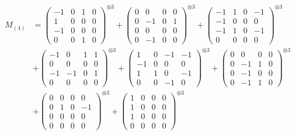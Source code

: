 \documentclass{article}
\newcommand{\Mthree}{%
    M_{(4)}
}
\begin{document}
        \footnotesize{
        \begin{align}
        \Mthree
        &= \label{Rs13-Rc12-Solution-1-c1} \begin{pmatrix} -1 & 0 & 1 & 0 \\ 1 & 0 & 0 & 0 \\ -1 & 0 & 0 & 0 \\ 0 & 0 & 1 & 0 \end{pmatrix}^{\otimes 3} 
            + \begin{pmatrix} 0 & 0 & 0 & 0 \\ 0 & -1 & 0 & 1 \\ 0 & 0 & 0 & 0 \\ 0 & -1 & 0 & 0 \end{pmatrix}^{\otimes 3} 
            + \begin{pmatrix} -1 & 1 & 0 & -1 \\ -1 & 0 & 0 & 0 \\ -1 & 1 & 0 & -1 \\ 0 & 0 & 0 & 0 \end{pmatrix}^{\otimes 3} \\
        &+ \label{Rs13-Rc12-Solution-1-c4} \begin{pmatrix} -1 & 0 & 1 & 1 \\ 0 & 0 & 0 & 0 \\ -1 & -1 & 0 & 1 \\ 0 & 0 & 0 & 0 \end{pmatrix}^{\otimes 3} 
            + \begin{pmatrix} 1 & 0 & -1 & -1 \\ -1 & 0 & 0 & 0 \\ 1 & 1 & 0 & -1 \\ 0 & 0 & -1 & 0 \end{pmatrix}^{\otimes 3} 
            + \begin{pmatrix} 0 & 0 & 0 & 0 \\ 0 & -1 & 1 & 0 \\ 0 & -1 & 0 & 0 \\ 0 & -1 & 1 & 0 \end{pmatrix}^{\otimes 3} \\
        &+ \label{Rs13-Rc12-Solution-1-c7} \begin{pmatrix} 0 & 0 & 0 & 0 \\ 0 & 1 & 0 & -1 \\ 0 & 0 & 0 & 0 \\ 0 & 0 & 0 & 0 \end{pmatrix}^{\otimes 3} 
            + \begin{pmatrix} 1 & 0 & 0 & 0 \\ 1 & 0 & 0 & 0 \\ 1 & 0 & 0 & 0 \\ 0 & 0 & 0 & 0 \end{pmatrix}^{\otimes 3} 

\end{align}}
\end{document}
